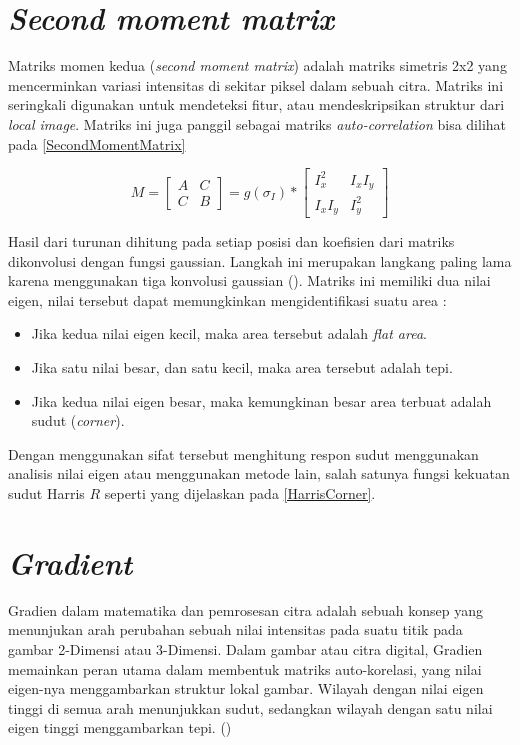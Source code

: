 \section{\emph{Second moment matrix}}
  Matriks momen kedua (\emph{second moment matrix}) adalah matriks simetris 2x2 yang mencerminkan variasi intensitas di sekitar piksel dalam sebuah citra. Matriks ini seringkali digunakan untuk mendeteksi fitur, atau mendeskripsikan struktur dari \emph{local image}.
Matriks ini juga panggil sebagai matriks \emph{auto-correlation} bisa dilihat pada \ref{SecondMomentMatrix}

\begin{equation}
  M = 
    \begin{bmatrix}
      A & C \\
      C & B
    \end{bmatrix}
    = g(\sigma_{I}) *
      \begin{bmatrix}
        I_{x}^2 & I_{x}I_{y} \\
        I_{x}I_{y} & I_{y}^2
      \end{bmatrix}
  \label{SecondMomentMatrix}
\end{equation}

Hasil dari turunan dihitung pada setiap posisi dan koefisien dari matriks dikonvolusi dengan fungsi gaussian. Langkah ini merupakan langkang paling lama karena menggunakan tiga konvolusi gaussian (\cite{Sanchez2018}). 
Matriks ini memiliki dua nilai eigen, nilai tersebut dapat memungkinkan mengidentifikasi suatu area :

\begin{itemize}
  \item Jika kedua nilai eigen kecil, maka area tersebut adalah \emph{flat area}.
  \item Jika satu nilai besar, dan satu kecil, maka area tersebut adalah tepi.
  \item Jika kedua nilai eigen besar, maka kemungkinan besar area terbuat adalah sudut (\emph{corner}).
\end{itemize}

Dengan menggunakan sifat tersebut menghitung respon sudut menggunakan analisis nilai eigen atau menggunakan metode lain, salah satunya fungsi kekuatan sudut Harris \(R\) seperti yang dijelaskan pada \ref{HarrisCorner}.

\section{\emph{Gradient}}
  Gradien dalam matematika dan pemrosesan citra adalah sebuah konsep yang menunjukan arah perubahan sebuah nilai intensitas pada suatu titik pada gambar 2-Dimensi atau 3-Dimensi. 
Dalam gambar atau citra digital, Gradien memainkan peran utama dalam membentuk matriks auto-korelasi, yang nilai eigen-nya menggambarkan struktur lokal gambar. 
Wilayah dengan nilai eigen tinggi di semua arah menunjukkan sudut, sedangkan wilayah dengan satu nilai eigen tinggi menggambarkan tepi. (\cite{Harris2013})

